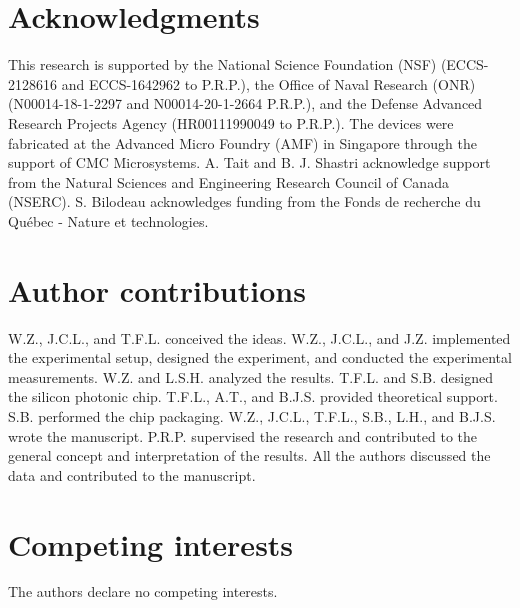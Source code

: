 \documentclass[pdflatex,mathphys]{sty}%
\begin{document}




\section{Acknowledgments}

This research is supported by the National Science Foundation (NSF) (ECCS-2128616 and ECCS-1642962 to P.R.P.), the Office of Naval Research (ONR) (N00014-18-1-2297 and N00014-20-1-2664 P.R.P.), and the Defense Advanced Research Projects Agency (HR00111990049 to P.R.P.). The devices were fabricated at the Advanced Micro Foundry (AMF) in Singapore through the support of CMC Microsystems. A. Tait and B. J. Shastri acknowledge support from the Natural Sciences and Engineering Research Council of Canada (NSERC). S. Bilodeau acknowledges funding from the Fonds de recherche du Québec - Nature et technologies.

\section{Author contributions}
W.Z., J.C.L., and T.F.L. conceived the ideas. W.Z., J.C.L., and J.Z. implemented the experimental setup, designed the experiment, and conducted the experimental measurements. W.Z. and L.S.H. analyzed the results. T.F.L. and S.B. designed the silicon photonic chip. T.F.L., A.T., and B.J.S. provided theoretical support. S.B. performed the chip packaging. W.Z., J.C.L., T.F.L., S.B., L.H., and B.J.S. wrote the manuscript. P.R.P. supervised the research and contributed to the general concept and interpretation of the results. All the authors discussed the data and contributed to the manuscript.

\section{Competing interests}
The authors declare no competing interests.
\end{document}
